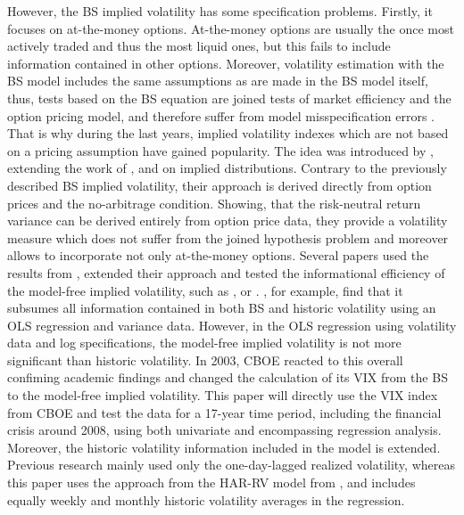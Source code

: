 However, the \ac{BS} implied volatility has some specification problems. Firstly, it focuses on at-the-money options. At-the-money options are usually the once most actively traded and thus the most liquid ones, but this fails to include information contained in other options. Moreover, volatility estimation with the \ac{BS} model includes the same assumptions as are made in the \ac{BS} model itself, thus, tests based on the \ac{BS} equation are joined tests of market efficiency and the option pricing model, and therefore suffer from model misspecification errors \parencite{jiang2003}. \\
That is why during the last years, implied volatility indexes which are not based on a pricing assumption have gained popularity. The idea was introduced by \textcite{britten2000}, extending the work of \textcite{derman1994} \textcite{dupire1994}, \textcite{dupire1997} and \textcite{rubinstein1994} on implied distributions. Contrary to the previously described \ac{BS} implied volatility, their approach is derived directly from option prices and the no-arbitrage condition. Showing, that the risk-neutral return variance can be derived entirely from option price data, they provide a volatility measure which does not suffer from the joined hypothesis problem and moreover allows to incorporate not only at-the-money options.
Several papers used the results from \textcite{britten200}, extended their approach and tested the informational efficiency of the model-free implied volatility, such as \textcite{bakanova2010}, \textcite{taylor2010} or \textcite{jiang2003}. \textcite{jiang2003}, for example, find that it subsumes all information contained in both \ac{BS} and historic volatility using an OLS regression and variance data. However, in the OLS regression using volatility data and log specifications, the model-free implied volatility is not more significant than historic volatility.
In 2003, \ac{CBOE} reacted to this overall confiming academic findings and changed the calculation of its \ac{VIX} from the \ac{BS} to the model-free implied volatility. This paper will directly use the \ac{VIX} index from \ac{CBOE} and test the data for a 17-year time period, including the financial crisis around 2008, using both univariate and encompassing regression analysis. Moreover, the historic volatility information included in the model is extended. Previous research mainly used only the one-day-lagged realized volatility, whereas this paper uses the approach from the HAR-RV model from \textcite{corsi2009}, and includes equally weekly and monthly historic volatility averages in the regression. 





